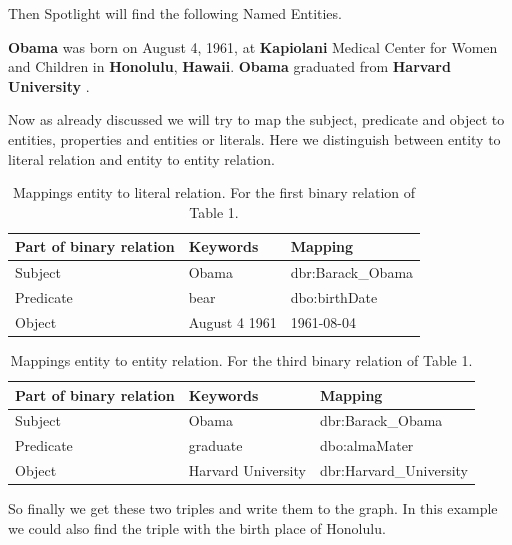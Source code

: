 \documentclass[runningheads]{llncs}
\begin{document}
Then Spotlight will find the following Named Entities.

\begin{example}
\textbf{Obama} was born on August 4, 1961, at \textbf{Kapiolani} Medical Center for
Women and Children in \textbf{Honolulu}, \textbf{Hawaii}. \textbf{Obama} graduated from
\textbf{Harvard University} .\end{example}

Now as already discussed we will try to map the subject, predicate and object to entities, properties and entities or literals. Here we distinguish between entity to literal relation and entity to entity relation.
\pagebreak

\begin{table}
	\caption{Mappings entity to literal relation. For the first binary relation of Table 1.}\label{tab2}
	\begin{center}
		\begin{tabularx}{\textwidth}{@{}|l|l|Y|@{}}
			\hline
			\textbf{Part of binary relation} &  \textbf{Keywords} & \textbf{Mapping}\\
			\hline
			Subject &  Obama & dbr:Barack\_Obama\\
			Predicate &  bear & dbo:birthDate\\
			Object &  August 4 1961  & 1961-08-04\\
			\hline
		\end{tabularx}
	\end{center}
\end{table}

\begin{table}
	\caption{Mappings entity to entity relation. For the third binary relation of Table 1.}\label{tab3}
	\begin{center}
		\begin{tabularx}{\textwidth}{@{}|l|l|Y|@{}}
			\hline
			\textbf{Part of binary relation} &  \textbf{Keywords} & \textbf{Mapping}\\
			\hline
			Subject &  Obama & dbr:Barack\_Obama\\
			Predicate &  graduate & dbo:almaMater\\
			Object &  Harvard University  & dbr:Harvard\_University\\
			\hline
		\end{tabularx}
	\end{center}
\end{table}
So finally we get these two triples and write them to the graph. In this example we could also find the triple with the birth place of Honolulu. 
\end{document}
